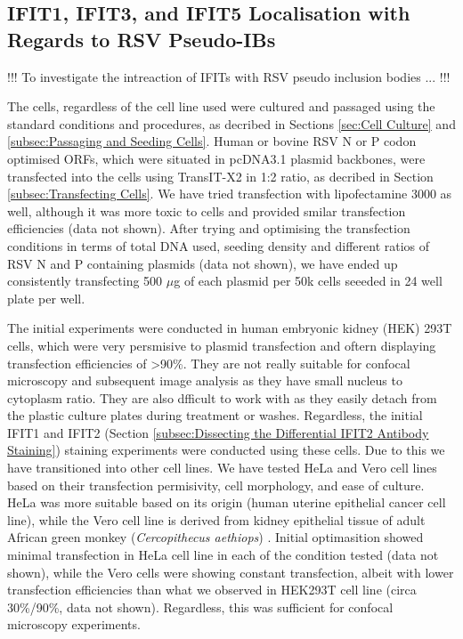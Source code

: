 \subsection{IFIT1, IFIT3, and IFIT5 Localisation with Regards to RSV Pseudo-IBs} \label{subsec:IFIT1, IFIT3, and IFIT5 Localisation with Regards to RSV Pseudo-IBs}


!!! To investigate the intreaction of IFITs with RSV pseudo inclusion bodies ... !!!

The cells, regardless of the cell line used were cultured and passaged using the standard conditions and procedures, as decribed in Sections \ref{sec:Cell Culture} and \ref{subsec:Passaging and Seeding Cells}. Human or bovine RSV N or P codon optimised ORFs, which were situated in pcDNA3.1 plasmid backbones, were transfected into the cells using TransIT-X2 in 1:2 ratio, as decribed in Section \ref{subsec:Transfecting Cells}. We have tried transfection with lipofectamine 3000 as well, although it was more toxic to cells and provided smilar transfection efficiencies (data not shown). After trying and optimising the transfection conditions in terms of total DNA used, seeding density and different ratios of RSV N and P containing plasmids (data not shown), we have ended up consistently transfecting 500 $\mu$g of each plasmid per 50k cells seeeded in 24 well plate per well.

The initial experiments were conducted in human embryonic kidney (HEK) 293T cells, which were very persmisive to plasmid transfection and oftern displaying transfection efficiencies of >90\%. They are not really suitable for confocal microscopy and subsequent image analysis as they have small nucleus to cytoplasm ratio. They are also dfficult to work with as they easily detach from the plastic culture plates during treatment or washes. Regardless, the initial IFIT1 and IFIT2 (Section \ref{subsec:Dissecting the Differential IFIT2 Antibody Staining}) staining experiments were conducted using these cells. Due to this we have transitioned into other cell lines. We have tested HeLa and Vero cell lines based on their transfection permisivity, cell morphology, and ease of culture. HeLa was more suitable based on its origin (human uterine epithelial cancer cell line), while the Vero cell line is derived from kidney epithelial tissue of adult African green monkey (\textit{Cercopithecus aethiops}) \cite{Simizu1967CharacterizationVero}. Initial optimasition showed minimal transfection in HeLa cell line in each of the condition tested (data not shown), while the Vero cells were showing constant transfection, albeit with lower transfection efficiencies than what we observed in HEK293T cell line (circa 30\%/90\%, data not shown). Regardless, this was sufficient for confocal microscopy experiments.

